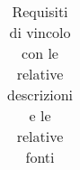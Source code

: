 \begin{center}
\begin{longtable}{|p{3cm}|p{9.85cm}|p{2cm}|}
		\caption{Requisiti di vincolo con le relative descrizioni e le relative fonti}

		\end{longtable}
	\end{center}
